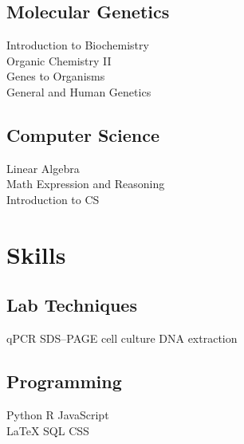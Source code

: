 \documentclass[]{deedy-resume-openfont}
\begin{document}
\begin{minipage}[t]{0.33\textwidth}
\subsection{Molecular Genetics}
 Introduction to Biochemistry  \\
 Organic Chemistry II \\
 Genes to Organisms \\
 General and Human Genetics \\

\sectionsep
\subsection{Computer Science}
 Linear Algebra \\
 Math Expression and Reasoning \\
 Introduction to CS \\
\sectionsep


\section{Skills}

\subsection{Lab Techniques}
qPCR \textbullet{} SDS–PAGE \textbullet{} cell culture \textbullet{} DNA extraction
\sectionsep

\subsection{Programming}
Python \textbullet{} R \textbullet{} JavaScript \\
\LaTeX \textbullet{} SQL \textbullet{}  CSS \\




%
%

\end{minipage}
\hfill
\end{document}

